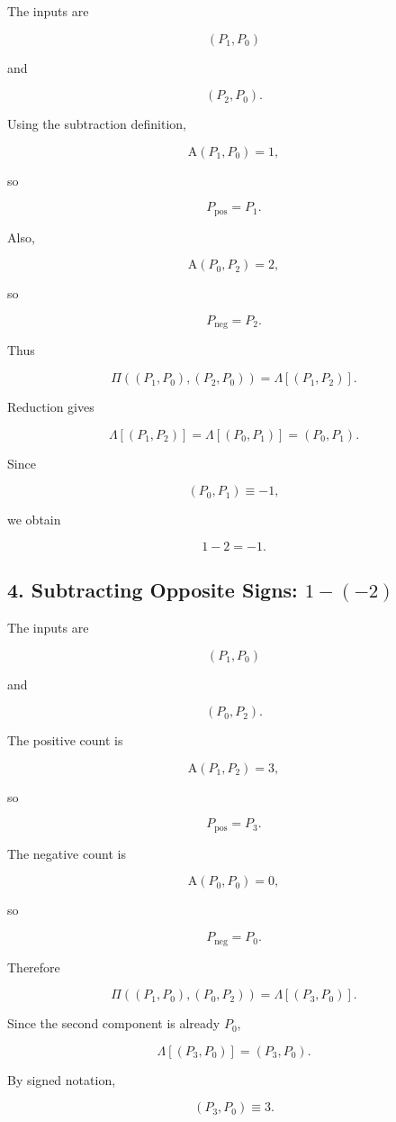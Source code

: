 \documentclass[12pt]{article}
\newcommand{\Alpha}{\mathrm{A}}
\begin{document}
The inputs are

\[
(P_1,P_0)
\]

and

\[
(P_2,P_0).
\]

Using the subtraction definition,

\[
\Alpha(P_1,P_0)=1,
\]

so

\[
P_{\mathrm{pos}}=P_1.
\]

Also,

\[
\Alpha(P_0,P_2)=2,
\]

so

\[
P_{\mathrm{neg}}=P_2.
\]

Thus

\[
\Pi
\left(
(P_1,P_0),(P_2,P_0)
\right)
=
\Lambda[(P_1,P_2)].
\]

Reduction gives

\[
\Lambda[(P_1,P_2)]
=
\Lambda[(P_0,P_1)]
=
(P_0,P_1).
\]

Since

\[
(P_0,P_1)\equiv-1,
\]

we obtain

\[
\boxed{
1-2=-1.
}
\]

\subsection*{4. Subtracting Opposite Signs: \(1-(-2)\)}

The inputs are

\[
(P_1,P_0)
\]

and

\[
(P_0,P_2).
\]

The positive count is

\[
\Alpha(P_1,P_2)=3,
\]

so

\[
P_{\mathrm{pos}}=P_3.
\]

The negative count is

\[
\Alpha(P_0,P_0)=0,
\]

so

\[
P_{\mathrm{neg}}=P_0.
\]

Therefore

\[
\Pi
\left(
(P_1,P_0),(P_0,P_2)
\right)
=
\Lambda[(P_3,P_0)].
\]

Since the second component is already \(P_0\),

\[
\Lambda[(P_3,P_0)]
=
(P_3,P_0).
\]

By signed notation,

\[
(P_3,P_0)\equiv3.
\]
\end{document}
